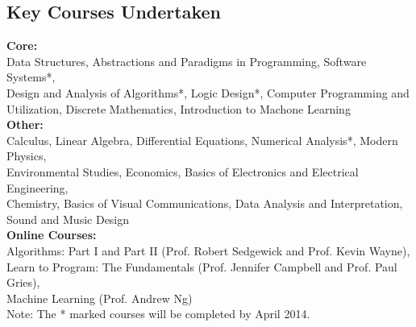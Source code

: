 \documentclass[margin,11pt]{resume}
\begin{document}
\begin{resume}
    \section{\mysidestyle Key Courses Undertaken} 

	\textbf{Core:} \\ Data Structures, Abstractions and Paradigms in Programming, Software Systems*, \\ Design and Analysis of Algorithms*, Logic Design*, Computer Programming and Utilization, Discrete Mathematics, Introduction to Machone Learning \\
	\textbf{Other:} \\ Calculus, Linear Algebra, Differential Equations, Numerical Analysis*, Modern Physics, \\ Environmental Studies, Economics, Basics of Electronics and Electrical Engineering, \\ Chemistry, Basics of Visual Communications, Data Analysis and Interpretation,\\ Sound and Music Design\\
	\textbf{Online Courses:} \\ Algorithms: Part I and Part II (Prof. Robert Sedgewick and Prof. Kevin Wayne), \\ Learn to Program: The Fundamentals (Prof. Jennifer Campbell and Prof. Paul Gries), \\ Machine Learning (Prof. Andrew Ng)
\vspace{1mm}\\%
	Note: The * marked courses will be completed by April 2014.


\end{resume}
\end{document}
